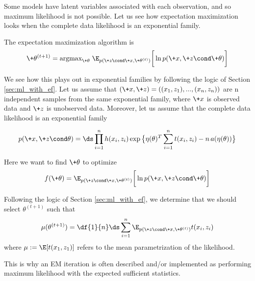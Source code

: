 \documentclass{article} %
\begin{document}
Some models have latent variables associated with each observation, and so maximum likelihood is not possible.  Let us see how expectation maximization looks when the complete data likelihood is an exponential family.

The expectation maximization algorithm is 
\begin{equation}
\label{eqn:em_algorithm_appendix}
 \+\theta^{(t+1)} =  \text{argmax}_{\+\theta} \; \E_{p(\+z \cond \+x , \+\theta^{(t)})} \bigg[ \ln p(\+x, \+z \cond \+\theta) \bigg] 
 \end{equation}

We see how this plays out in exponential families by following the logic of Section \ref{sec:ml_with_ef}.   Let us assume that $(\+x, \+z)=((x_1,z_1), ..., (x_n, z_n))$ are n independent samples from the same exponential family, where $\+x$ is observed data and $\+z$ is unobserved data.
Moreover, let us assume that the complete data likelihood is an exponential family

\begin{align}
\label{eqn:exponential_family_complete_data_likelihood}
 p(\+x, \+z \cond \theta) = \ds\prod_{i=1}^n h(x_i, z_i) \exp \big\{ \eta(\theta)^T \sum_{i=1}^n t(x_i, z_i) - n \,a(\eta(\theta))\big\} 
 \end{align}

Here we want to find $\+\theta$ to optimize 
\[ f(\+\theta) =  \E_{p(\+z \cond \+x , \+\theta^{(t)})} \bigg[ \ln p(\+x, \+z \cond \+\theta) \bigg] \]

Following the logic of Section \ref{sec:ml_with_ef}, we determine that we should select $\theta^{(t+1)}$ such that
\[ \mu(\theta^{(t+1)}) = \df{1}{n} \ds\sum_{i=1}^n   \E_{p(\+z \cond \+x , \+\theta^{(t)})} t(x_i, z_i) \]
where $\mu := \E[t(x_1,z_1)]$ refers to the mean parametrization of the likelihood.

This is why an EM iteration is often described and/or implemented as performing maximum likelihood with the expected sufficient statistics.


 
\end{document}
